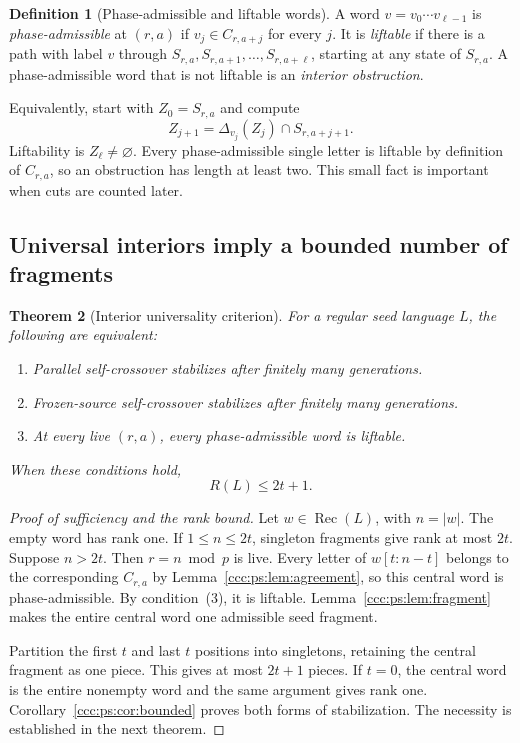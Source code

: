 \documentclass[11pt,letterpaper]{article}
\newtheorem{theorem}{Theorem}[section]
\theoremstyle{definition}
\newtheorem{definition}[theorem]{Definition}
\theoremstyle{remark}
\newcommand{\rec}{\operatorname{Rec}}
\begin{document}
\begin{definition}[Phase-admissible and liftable words]\label{ccc:ps:def:liftable}
A word $v=v_0\cdots v_{\ell-1}$ is \emph{phase-admissible} at $(r,a)$ if
$v_j\in C_{r,a+j}$ for every $j$. It is \emph{liftable} if there is a
path with label $v$ through
$S_{r,a},S_{r,a+1},\ldots,S_{r,a+\ell}$, starting at any state of
$S_{r,a}$. A phase-admissible word that is not liftable is an
\emph{interior obstruction}.
\end{definition}

Equivalently, start with $Z_0=S_{r,a}$ and compute
\begin{equation}\label{ccc:ps:eq:subset-evolution}
 Z_{j+1}=\Delta_{v_j}(Z_j)\cap S_{r,a+j+1}.
\end{equation}
Liftability is $Z_\ell\ne\varnothing$. Every phase-admissible single letter
is liftable by definition of $C_{r,a}$, so an obstruction has length at
least two. This small fact is important when cuts are counted later.

\subsection{Universal interiors imply a bounded number of fragments}

\begin{theorem}[Interior universality criterion]\label{ccc:ps:thm:criterion}
For a regular seed language $L$, the following are equivalent:
\begin{enumerate}
\item Parallel self-crossover stabilizes after finitely many generations.
\item Frozen-source self-crossover stabilizes after finitely many generations.
\item At every live $(r,a)$, every phase-admissible word is liftable.
\end{enumerate}
When these conditions hold,
\begin{equation}\label{ccc:ps:eq:transient-bound}
 R(L)\le2t+1.
\end{equation}
\end{theorem}
\begin{proof}[Proof of sufficiency and the rank bound]
Let $w\in\rec(L)$, with $n=|w|$. The empty word has rank one.
If $1\le n\le2t$, singleton fragments give rank at most $2t$.
Suppose $n>2t$. Then $r=n\bmod p$ is live. Every letter of
$w[t:n-t]$ belongs to the corresponding $C_{r,a}$ by
Lemma~\ref{ccc:ps:lem:agreement}, so this central word is phase-admissible.
By condition~(3), it is liftable. Lemma~\ref{ccc:ps:lem:fragment} makes the
entire central word one admissible seed fragment.

Partition the first $t$ and last $t$ positions into singletons, retaining
the central fragment as one piece. This gives at most $2t+1$ pieces.
If $t=0$, the central word is the entire nonempty word and the same
argument gives rank one. Corollary~\ref{ccc:ps:cor:bounded} proves both forms of
stabilization. The necessity is established in the next theorem.
\end{proof}
\end{document}
